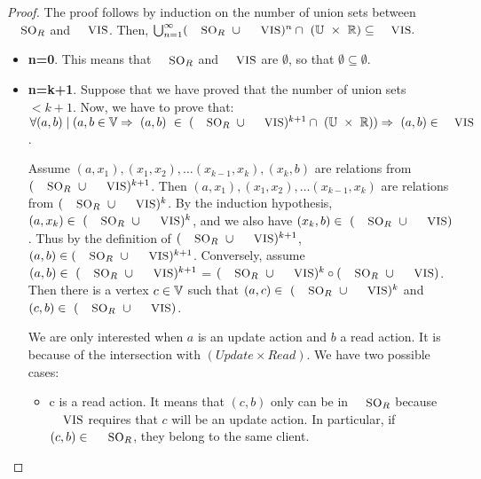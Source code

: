 \documentclass[envcountsect,runningheads,orivec]{llncs}
\begin{document}
\begin{proof} The proof follows by induction on the number of union sets between $\textsc{\small{SO}}_R$ and $\textsc{\small{VIS}}$. Then, $\bigcup_{n=1}^{\infty} (\textsc{\small{SO}}_R \ \cup \ \textsc{\small{VIS}} ) ^{n} \cap \ (\mathbb{U}\ \times \ \mathbb{R}) \subseteq \textsc{\small{VIS}}.$
\begin{itemize}
   \item{\bf n=0}. This means that $\textsc{\small{SO}}_R$ and $\textsc{\small{VIS}}$ are $\emptyset$, so that $\emptyset \subseteq \emptyset$.
   \item{\bf n=k+1}. Suppose that we have proved that the number of union sets $< k+1$. Now, we have to prove that: $\forall (a,b) \mid (a,b \in \verticesets \Rightarrow\ (a,b)\ \in\ (\textsc{\small{SO}}_R \ \cup \ \textsc{\small{VIS}} ) ^{k+1} \cap \ (\mathbb{U}\ \times \ \mathbb{R})) \Rightarrow\ (a,b) \in \textsc{\small{VIS}}$.
	
Assume $(a, x_1),(x_1, x_2),\ldots(x_{k{-}1}, x_k),(x_{k}, b)$ are relations from $(\textsc{\small{SO}}_R \ \cup \ \textsc{\small{VIS}} ) ^{k+1}$. Then $(a, x_1),(x_1, x_2),\ldots(x_{k{-}1}, x_k)$ are relations from $(\textsc{\small{SO}}_R \ \cup \ \textsc{\small{VIS}} ) ^{k}$. By the induction hypothesis, $(a, x_k) \in\ (\textsc{\small{SO}}_R \ \cup \ \textsc{\small{VIS}} ) ^{k}$, and we also have $(x_k, b) \in\ (\textsc{\small{SO}}_R \ \cup \ \textsc{\small{VIS}} )$. Thus by the definition of $(\textsc{\small{SO}}_R \ \cup \ \textsc{\small{VIS}} ) ^{k+1}$, $(a, b) \in
(\textsc{\small{SO}}_R \ \cup \ \textsc{\small{VIS}} ) ^{k+1}$.
Conversely, assume $(a,b) \in\ (\textsc{\small{SO}}_R \ \cup \ \textsc{\small{VIS}} ) ^{k+1}$ = $(\textsc{\small{SO}}_R \ \cup \ \textsc{\small{VIS}} ) ^{k} \circ (\textsc{\small{SO}}_R \ \cup \ \textsc{\small{VIS}})$. Then there is a vertex $c \in \mathbb{V}$ such
that $(a,c) \in\ (\textsc{\small{SO}}_R \ \cup \ \textsc{\small{VIS}} ) ^{k}$ and $(c, b) \in\ (\textsc{\small{SO}}_R \ \cup \ \textsc{\small{VIS}} )$.

We are only interested when $a$ is an update action and $b$ a read action. It is because of the intersection with $(Update \times Read)$. We have two possible cases:

\begin{itemize}
	\item c is a read action. It means that $(c, b)$ only can be in $\textsc{\small{SO}}_R$ because $\textsc{\small{VIS}}$ requires that $c$ will be an update action. In particular, if  $(c, b) \in\ \textsc{\small{SO}}_R$, they belong to the same client. 
	

\end{itemize}
\end{itemize}
\end{proof}
\end{document}
